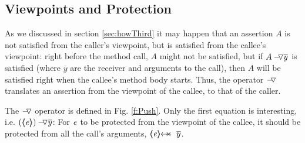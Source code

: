    
 \subsection{Viewpoints and Protection}
 \label{s:viewAndProtect}
 
 As we discussed in section \ref{sec:howThird} it may happen that an assertion $A$ is not satisfied from the caller’s
viewpoint, but is satisfied from the callee’s viewpoint:  right before the method call, $A$ might not be satisfied,
but if  $\PushASLong  {\overline y} A$ is satisfied (where $\overline y$ are the receiver and arguments to the call), then $A$
will be satisfied right when the callee’s method body starts. Thus, the operator $\pushSymbolAA$
 translates an assertion from the viewpoint of the callee, to that of the caller.
 


The  $\pushSymbolAA$  operator is  defined in Fig. \ref{f:Push}. 
Only the first equation is interesting, i.e.  $\PushAS y {(\inside \re)}$: For 
$\re$ to be protected from the viewpoint of the callee, it should be protected from all the call's arguments,
\ie  $\protectedFrom {\re} {\overline {y}}$. 


